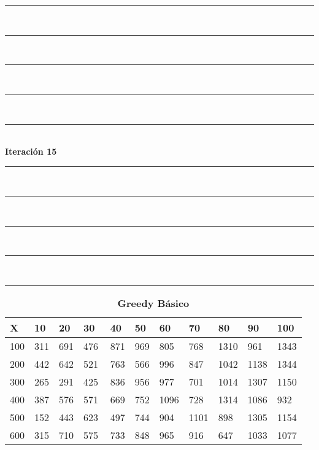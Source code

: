 \documentclass[10pt,letterpaper]{article}
\begin{document}
\newpage 
\begin{center}
\newcommand{\HRule}{\rule{\linewidth}{0.5mm}}
\center
\HRule\\[6cm]
\HRule\\[0.4cm]
\HRule\\[0.4cm]
\HRule\\[0.4cm]
\HRule\\[0.4cm]
{\centering \Huge\bfseries Iteración 15}\\[0.4cm]
\HRule\\[0.4cm]
\HRule\\[0.4cm]
\HRule\\[0.4cm]
\HRule\\[6cm]
\HRule
\end{center}
\newpage 
{}
\begin{center}
\begin{table}\renewcommand{\arraystretch}{2.5}
\caption{\large \textbf{Greedy Básico}}
\centering
\begin{tabular} { |m{0.5cm}|m{1.3cm}|m{1.3cm}|m{1.3cm}|m{1.3cm}|m{1.3cm}|m{1.3cm}|m{1.3cm}|m{1.3cm}|m{1.3cm}|m{1.3cm}|} 
\hline
\rowcolor{Gray}
\centering \textbf{X} & \centering \textbf{10} & \centering \textbf{20} & \centering \textbf{30}\ & \centering \textbf{40} & \centering \textbf{50} & \centering \textbf{60}\ & \centering \textbf{70} & \centering \textbf{80} & \centering \textbf{90}\ & \textbf{100} \\\hline
\cellcolor{Gray}100 & \Large 311 & \Large 691 & \Large 476 & \Large 871 & \Large 969 & \Large 805 & \Large 768 & \Large 1310 & \Large 961 & \Large 1343 \\
\hline
\cellcolor{Gray}200 & \Large 442 & \Large 642 & \Large 521 & \Large 763 & \Large 566 & \Large 996 & \Large 847 & \Large 1042 & \Large 1138 & \Large 1344 \\
\hline
\cellcolor{Gray}300 & \Large 265 & \Large 291 & \Large 425 & \Large 836 & \Large 956 & \Large 977 & \Large 701 & \Large 1014 & \Large 1307 & \Large 1150 \\
\hline
\cellcolor{Gray}400 & \Large 387 & \Large 576 & \Large 571 & \Large 669 & \Large 752 & \Large 1096 & \Large 728 & \Large 1314 & \Large 1086 & \Large 932 \\
\hline
\cellcolor{Gray}500 & \Large 152 & \Large 443 & \Large 623 & \Large 497 & \Large 744 & \Large 904 & \Large 1101 & \Large 898 & \Large 1305 & \Large 1154 \\
\hline
\cellcolor{Gray}600 & \Large 315 & \Large 710 & \Large 575 & \Large 733 & \Large 848 & \Large 965 & \Large 916 & \Large 647 & \Large 1033 & \Large 1077 \\

\end{tabular}
\end{table}
\end{center}
\end{document}
